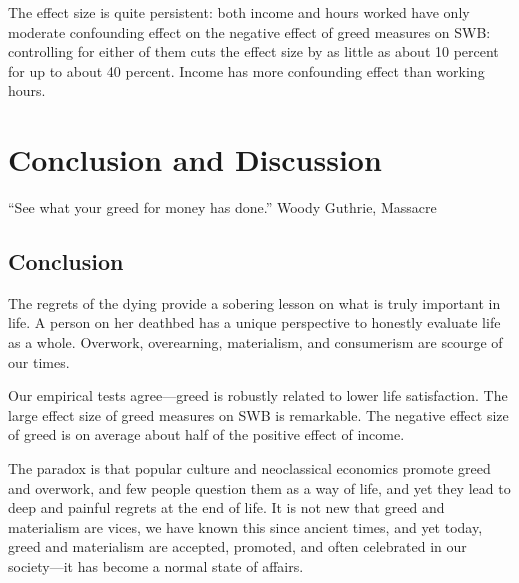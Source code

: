 \documentclass[10pt, letterpaper]{article}
\begin{document}
\begin{spacing}{1.8}
The effect size is quite persistent: both income and  hours worked have only moderate confounding effect on the negative effect of greed measures on SWB:
controlling for either of them cuts the effect size by as little as about 10 percent for up to about 40 percent. Income has more confounding effect than working hours. 

\section{Conclusion and Discussion}

``See what your greed for money has done.'' Woody Guthrie, Massacre%


\subsection{Conclusion}

The regrets of the dying \citep{ware12} provide a sobering lesson on what is
truly important in life. A person on her deathbed has a unique perspective to
honestly evaluate life as a whole. Overwork, overearning, materialism, and consumerism are scourge of our times.

Our empirical tests agree---greed is
robustly related to lower life satisfaction. The large effect size of greed measures on SWB is remarkable. The negative effect size of greed is on average about half of the positive effect of income.

The paradox is that popular culture and neoclassical economics promote greed and overwork, and few people question them as a way of life, and yet they lead to deep and painful regrets at the end of life.
%
 It is not new that greed and materialism are vices, we have known this since ancient times, and yet today, greed and materialism are accepted, promoted, and often celebrated in our society---it has become a normal state of affairs. 
 


\end{spacing}
\end{document}
